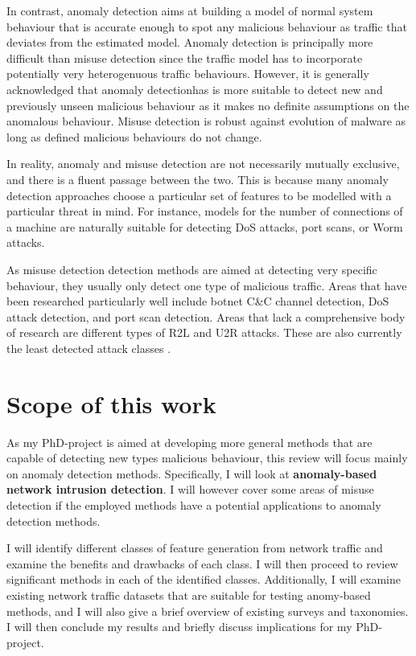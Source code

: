 \documentclass[a4paper,12pt,twoside]{report}
\begin{document}
In contrast, anomaly detection aims at building a model of normal system behaviour that is accurate enough to spot any malicious behaviour as traffic that deviates from the estimated model. Anomaly detection is principally more difficult than misuse detection since the traffic model has to incorporate potentially very heterogenuous traffic behaviours. However, it is generally acknowledged that anomaly detectionhas is more suitable to detect new and previously unseen malicious behaviour as it makes no definite assumptions on the anomalous behaviour. Misuse detection is robust against evolution of malware as long as defined malicious behaviours do not change.

In reality, anomaly and misuse detection are not necessarily mutually exclusive, and there is a fluent passage between the two. This is because many anomaly detection approaches choose a particular set of features to be modelled with a particular threat in mind. For instance, models for the number of connections of a machine are naturally suitable for detecting DoS attacks, port scans, or Worm attacks. 

As misuse detection detection methods are aimed at detecting very specific behaviour, they usually only detect one type of malicious traffic. Areas that have been researched particularly well include botnet C\&C channel detection, DoS attack detection, and port scan detection. Areas that lack a comprehensive body of research are different types of R2L and U2R attacks. These are also currently the least   detected   attack   classes \cite{nisioti2018intrusion}.

\section{Scope of this work}

As my PhD-project is aimed at developing more general methods that are capable of detecting new types malicious behaviour, this review will focus mainly on anomaly detection methods. Specifically, I will look at \textbf{anomaly-based network intrusion detection}. I will however cover some areas of misuse detection if the employed methods have a potential applications to anomaly detection methods.


I will identify different classes of feature generation from network traffic and examine the benefits and drawbacks of each class. I will then proceed to review significant methods in each of the identified classes. Additionally, I will examine existing network traffic datasets that are suitable for testing anomy-based methods, and I will also give a brief overview of existing surveys and taxonomies. I will then conclude my results and briefly discuss implications for my PhD-project.
\end{document}
